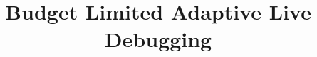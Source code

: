 \documentclass{sig-alternate}
\begin{document}
\title{Budget Limited Adaptive Live Debugging}


\maketitle


\newcommand{\iprobe}{\texttt{iProbe}\xspace}
\newcommand{\livedebugging}{\emph{Live Debugging}\xspace}
\newcommand{\parikshan}{\texttt{Parikshan}\xspace}
\newtheorem{example}{Example}
\def\infinity{\rotatebox{90}{8}}











\end{document}
